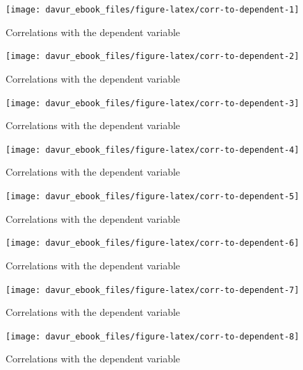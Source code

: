 \documentclass[]{book}
\begin{document}
\begin{figure}

{\centering \texttt{[image: davur\_ebook\_files/figure-latex/corr-to-dependent-1]} 

}

\caption{Correlations with the dependent variable}\label{fig:corr-to-dependent1}
\end{figure}
\begin{figure}

{\centering \texttt{[image: davur\_ebook\_files/figure-latex/corr-to-dependent-2]} 

}

\caption{Correlations with the dependent variable}\label{fig:corr-to-dependent2}
\end{figure}
\begin{figure}

{\centering \texttt{[image: davur\_ebook\_files/figure-latex/corr-to-dependent-3]} 

}

\caption{Correlations with the dependent variable}\label{fig:corr-to-dependent3}
\end{figure}
\begin{figure}

{\centering \texttt{[image: davur\_ebook\_files/figure-latex/corr-to-dependent-4]} 

}

\caption{Correlations with the dependent variable}\label{fig:corr-to-dependent4}
\end{figure}
\begin{figure}

{\centering \texttt{[image: davur\_ebook\_files/figure-latex/corr-to-dependent-5]} 

}

\caption{Correlations with the dependent variable}\label{fig:corr-to-dependent5}
\end{figure}
\begin{figure}

{\centering \texttt{[image: davur\_ebook\_files/figure-latex/corr-to-dependent-6]} 

}

\caption{Correlations with the dependent variable}\label{fig:corr-to-dependent6}
\end{figure}
\begin{figure}

{\centering \texttt{[image: davur\_ebook\_files/figure-latex/corr-to-dependent-7]} 

}

\caption{Correlations with the dependent variable}\label{fig:corr-to-dependent7}
\end{figure}
\begin{figure}

{\centering \texttt{[image: davur\_ebook\_files/figure-latex/corr-to-dependent-8]} 

}

\caption{Correlations with the dependent variable}\label{fig:corr-to-dependent8}
\end{figure}
\end{document}
